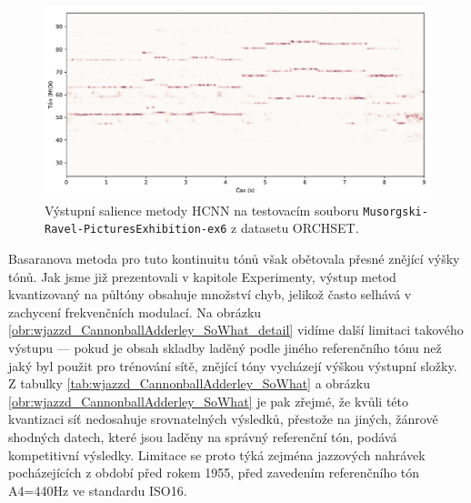 \begin{figure}[h]\centering
\includegraphics[width=\textwidth,height=\textheight,keepaspectratio]{../img/vysledky/orchset_Musorgski-Ravel-PicturesExhibition-ex6_salience}
\caption{Výstupní salience metody HCNN na testovacím souboru \texttt{Musorgski-Ravel-PicturesExhibition-ex6} z datasetu ORCHSET.}
\label{obr:orchset_Musorgski-Ravel-PicturesExhibition-ex6_salience}
\end{figure}

Basaranova metoda pro tuto kontinuitu tónů však obětovala přesné znějící výšky tónů. Jak jsme již prezentovali v kapitole Experimenty, výstup metod kvantizovaný na půltóny obsahuje množství chyb, jelikož často selhává v zachycení frekvenčních modulací. Na obrázku \ref{obr:wjazzd_CannonballAdderley_SoWhat_detail} vidíme další limitaci takového výstupu --- pokud je obsah skladby laděný podle jiného referenčního tónu než jaký byl použit pro trénování sítě, znějící tóny vycházejí výškou  výstupní složky. Z tabulky \ref{tab:wjazzd_CannonballAdderley_SoWhat} a obrázku \ref{obr:wjazzd_CannonballAdderley_SoWhat} je pak zřejmé, že kvůli této kvantizaci síť nedosahuje srovnatelných výsledků, přestože na jiných, žánrově shodných datech, které jsou laděny na správný referenční tón, podává kompetitivní výsledky. Limitace se proto týká zejména jazzových nahrávek pocházejících z období před rokem 1955, před zavedením referenčního tón A4=440Hz ve standardu ISO16.


